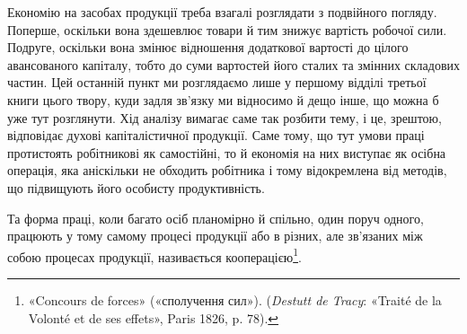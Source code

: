 
Економію на засобах продукції треба взагалі розглядати з
подвійного погляду. Поперше, оскільки вона здешевлює товари
й тим знижує вартість робочої сили. Подруге, оскільки вона змінює
відношення додаткової вартості до цілого авансованого капіталу,
тобто до суми вартостей його сталих та змінних складових
частин. Цей останній пункт ми розглядаємо лише у першому
відділі третьої книги цього твору, куди задля зв’язку ми відносимо
й дещо інше, що можна б уже тут розглянути. Хід аналізу
вимагає саме так розбити тему, і це, зрештою, відповідає духові
капіталістичної продукції. Саме тому, що тут умови праці протистоять
робітникові як самостійні, то й економія на них виступає
як осібна операція, яка аніскільки не обходить робітника і
тому відокремлена від методів, що підвищують його особисту продуктивність.

Та форма праці, коли багато осіб планомірно й спільно, один
поруч одного, працюють у тому самому процесі продукції або в різних,
але зв’язаних між собою процесах продукції, називається
кооперацією\footnote{
«Concours de forces» («сполучення сил»). (\emph{Destutt de Tracy}: «Traité
de la Volonté et de ses effets», Paris 1826, p. 78).
}.

